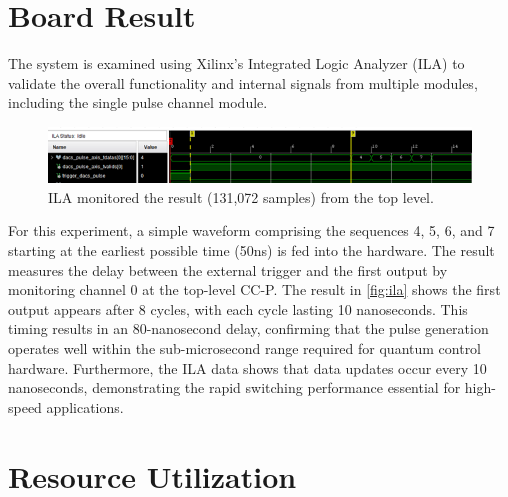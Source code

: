 \section{Board Result}
The system is examined using Xilinx's Integrated Logic Analyzer (ILA) to validate the overall functionality and internal signals from multiple modules, including the single pulse channel module.  
\begin{figure}[h]
    \centering
    \includegraphics[width=1\linewidth]{figures/ila.png}
    \caption{ILA monitored the result (131,072 samples) from the top level.}
    \label{fig:ila}
\end{figure}
For this experiment, a simple waveform comprising the sequences 4, 5, 6, and 7 starting at the earliest possible time (50ns) is fed into the hardware. The result measures the delay between the external trigger and the first output by monitoring channel 0 at the top-level CC-P. The result in \autoref{fig:ila} shows the first output appears after 8 cycles, with each cycle lasting 10 nanoseconds. This timing results in an 80-nanosecond delay, confirming that the pulse generation operates well within the sub-microsecond range required for quantum control hardware. Furthermore, the ILA data shows that data updates occur every 10 nanoseconds, demonstrating the rapid switching performance essential for high-speed applications.

\section{Resource Utilization}

